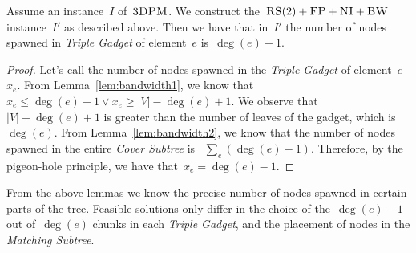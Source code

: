 \documentclass[preprint,12pt]{elsarticle}
\newcommand{\CC}{\textsc{NI}}
\newcommand{\FP}{\textsc{FP}}
\newcommand{\RS}{\textsc{RS}}
\newcommand{\BW}{\textsc{BW}}
\newcommand{\TDPM}{\textsc{3DPM}}
\newcommand{\numNodes}{\ensuremath{|V|}}
\newcommand{\MatchSubtree}{{\emph{Matching Subtree}}}
\newcommand{\CoverSubtree}{{\emph{Cover Subtree}}}
\newcommand{\TripleGadget}{{\emph{Triple Gadget}}}
\newcommand{\ElGadget}{{\emph{Element Gadget}}}
\newcommand{\Band}{\textsc{bw}}
\newtheorem{obs}{Observation}
\newcommand{\CostCom}{\ensuremath{b_2}}
\begin{document}
\begin{lemma}
  Assume an instance~$I$ of~$\TDPM$. We construct the~$\RS(2)+\FP+\CC+\BW$ instance~$I'$
 as described above. Then we have that in~$I'$ the number of nodes spawned in {\TripleGadget} of
  element~$e$ is~$\deg(e)-1$.
  \label{lem:bandwidth3}
\end{lemma}

\begin{proof}
  Let's call the number of nodes spawned in the {\TripleGadget} of
  element~$e$~$x_e$.  From Lemma~\ref{lem:bandwidth1}, we know that
 ~$x_e \leq \deg(e) - 1 \vee x_e \geq |V| - \deg(e) + 1$. We observe
  that~$|V| - \deg(e) + 1$ is greater than the number of leaves of the
  gadget, which is~$\deg(e)$.  From Lemma~\ref{lem:bandwidth2}, we know
  that the number of nodes spawned in the entire {\CoverSubtree} is
 ~$\sum_e (\deg(e)-1)$. Therefore, by the pigeon-hole principle, we have
  that~$x_e = \deg(e)-1$.
\end{proof}

From the above lemmas we know the precise number of nodes spawned in
certain parts of the tree. Feasible solutions only differ in 
the choice of the~$\deg(e) - 1$ out of~$\deg(e)$ chunks
in each {\TripleGadget}, and the placement of nodes in the
{\MatchSubtree}.

%
% 
%
%
% 
%
%
%
%
%
\end{document}
